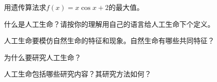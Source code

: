\begin{question}
用遗传算法求$f(x)=x\cos x + 2$的最大值。
\end{question}
\begin{solution}
\end{solution}

\begin{question}
什么是人工生命？请按你的理解用自己的语言给人工生命下个定义。
\end{question}
\begin{solution}
\end{solution}

\begin{question}
人工生命要模仿自然生命的特征和现象。自然生命有哪些共同特征？
\end{question}
\begin{solution}
\end{solution}

\begin{question}
为什么要研究人工生命？
\end{question}
\begin{solution}
\end{solution}

\begin{question}
人工生命包括哪些研究内容？其研究方法如何？
\end{question}
\begin{solution}
\end{solution}